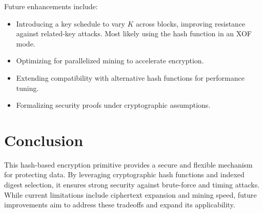 \documentclass[11pt,a4paper]{article}
\begin{document}
Future enhancements include:
\begin{itemize}
  \item Introducing a key schedule to vary \( K \) across blocks, improving resistance against related-key attacks. Most likely using the hash function in an XOF mode.
  \item Optimizing for parallelized mining to accelerate encryption.
  \item Extending compatibility with alternative hash functions for performance tuning.
  \item Formalizing security proofs under cryptographic assumptions.
\end{itemize}

\section*{Conclusion}

This hash-based encryption primitive provides a secure and flexible mechanism for protecting data. By leveraging cryptographic hash functions and indexed digest selection, it ensures strong security against brute-force and timing attacks. While current limitations include ciphertext expansion and mining speed, future improvements aim to address these tradeoffs and expand its applicability.
\end{document}
